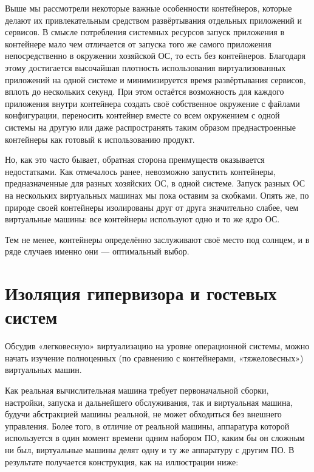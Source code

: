 \documentclass[14pt, a4paper]{article}
\begin{document}
Выше мы рассмотрели некоторые важные особенности контейнеров, которые делают их
привлекательным средством развёртывания отдельных приложений и сервисов. В смысле
потребления системных ресурсов запуск приложения в контейнере мало чем отличается от запуска
того же самого приложения непосредственно в окружении хозяйской ОС, то есть без контейнеров.
Благодаря этому достигается высочайшая плотность использования виртуализованных приложений
на одной системе и минимизируется время развёртывания сервисов, вплоть до нескольких секунд.
При этом остаётся возможность для каждого приложения внутри контейнера создать своё
собственное окружение с файлами конфигурации, переносить контейнер вместе со всем окружением
с одной системы на другую или даже распространять таким образом преднастроенные контейнеры
как готовый к использованию продукт.

Но, как это часто бывает, обратная сторона преимуществ оказывается недостатками. Как отмечалось
ранее, невозможно запустить контейнеры, предназначенные для разных хозяйских ОС, в одной
системе. Запуск разных ОС на нескольких виртуальных машинах мы пока оставим за скобками. Опять
же, по природе своей контейнеры изолированы друг от друга значительно слабее, чем виртуальные
машины: все контейнеры используют одно и то же ядро ОС.

Тем не менее, контейнеры определённо заслуживают своё место под солнцем, и в ряде случаев
именно они — оптимальный выбор.\newpage


\section*{Изоляция гипервизора и гостевых систем}


Обсудив «легковесную» виртуализацию на уровне операционной системы, можно начать изучение
полноценных (по сравнению с контейнерами, «тяжеловесных») виртуальных машин.

Как реальная вычислительная машина требует первоначальной сборки, настройки, запуска и
дальнейшего обслуживания, так и виртуальная машина, будучи абстракцией машины реальной, не
может обходиться без внешнего управления. Более того, в отличие от реальной машины, аппаратура
которой используется в один момент времени одним набором ПО, каким бы он сложным ни был,
виртуальные машины делят одну и ту же аппаратуру с другим ПО. В результате получается
конструкция, как на иллюстрации ниже:
\end{document}
